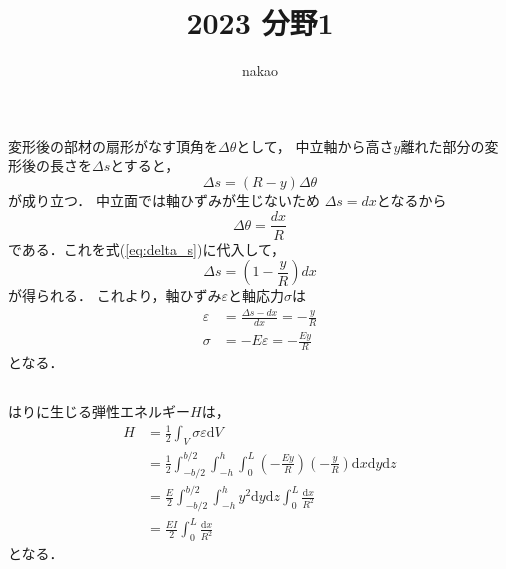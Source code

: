 \documentclass[a4paper]{jsarticle}
\begin{document}
\title{2023 分野1}
\author{nakao}
\maketitle

\section{}
\subsection{}
変形後の部材の扇形がなす頂角を$\Delta \theta$として，
中立軸から高さ$y$離れた部分の変形後の長さを$\Delta s$とすると，
\begin{equation}
  \label{eq:delta_s}
  \Delta s = (R - y) \Delta \theta
\end{equation}
が成り立つ．
中立面では軸ひずみが生じないため
$\Delta s = dx$となるから
\begin{equation}
  \Delta \theta = \frac{dx}{R}
\end{equation}
である．これを式(\ref{eq:delta_s})に代入して，
\begin{equation}
  \Delta s = \left(1 - \frac{y}{R}\right) dx
\end{equation}
が得られる．
これより，軸ひずみ$\varepsilon$と軸応力$\sigma$は
\begin{align}
  \varepsilon & = \frac{\Delta s - dx}{dx} = -\frac{y}{R} \\
  \sigma      & = -E \varepsilon = - \frac{E y}{R}
\end{align}
となる．

\subsection{}
はりに生じる弾性エネルギー$H$は，
\begin{equation}
  \begin{aligned}
    H & = \frac{1}{2} \int_V \sigma \varepsilon \mathrm{d} V    \\
      & = \frac{1}{2} \int_{-b/2}^{b/2} \int_{-h}^h \int_0^L
    \left(-\frac{E y}{R}\right) \left(-\frac{y}{R}\right)
    \mathrm{d} x \mathrm{d} y \mathrm{d} z                      \\
      & = \frac{E}{2} \int_{-b/2}^{b/2} \int_{-h}^h y^2
    \mathrm{d} y \mathrm{d} z \int_0^L \frac{\mathrm{d} x}{R^2} \\
      & = \frac{E I}{2} \int_0^L \frac{\mathrm{d} x}{R^2}
  \end{aligned}
\end{equation}
となる．
\end{document}
